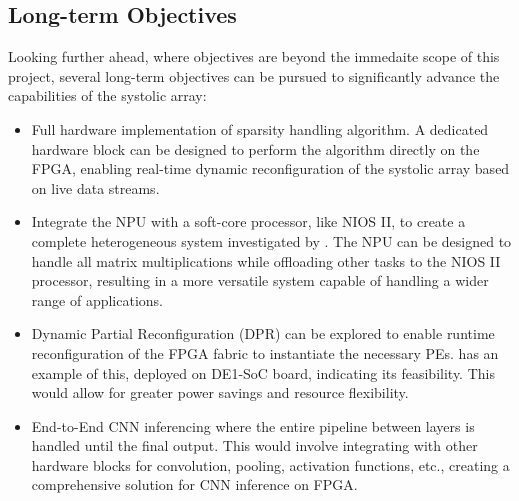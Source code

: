 \documentclass[12pt, a4paper, ukenglish]{article}
\begin{document}
    \subsection{Long-term Objectives} \label{sec: long-term}
    Looking further ahead, where objectives are beyond the immedaite scope of this project, several long-term objectives can be pursued to significantly advance the capabilities of the systolic array:
    \begin{itemize}
        \item Full hardware implementation of sparsity handling algorithm. A dedicated hardware block can be designed to perform the algorithm directly on the FPGA, enabling real-time dynamic reconfiguration of the systolic array based on live data streams.
        \item Integrate the NPU with a soft-core processor, like NIOS II, to create a complete heterogeneous system investigated by \textcite{liu_energy-efficient_2024}. The NPU can be designed to handle all matrix multiplications while offloading other tasks to the NIOS II processor, resulting in a more versatile system capable of handling a wider range of applications. %
        \item Dynamic Partial Reconfiguration (DPR) can be explored to enable runtime reconfiguration of the FPGA fabric to instantiate the necessary PEs. \textcite{beasley_developing_nodate} has an example of this, deployed on DE1-SoC board, indicating its feasibility. This would allow for greater power savings and resource flexibility.
        \item End-to-End CNN inferencing where the entire pipeline between layers is handled until the final output. This would involve integrating with other hardware blocks for convolution, pooling, activation functions, etc., creating a comprehensive solution for CNN inference on FPGA.
    \end{itemize}




    



\newpage
{}
\printbibliography


\end{document}
